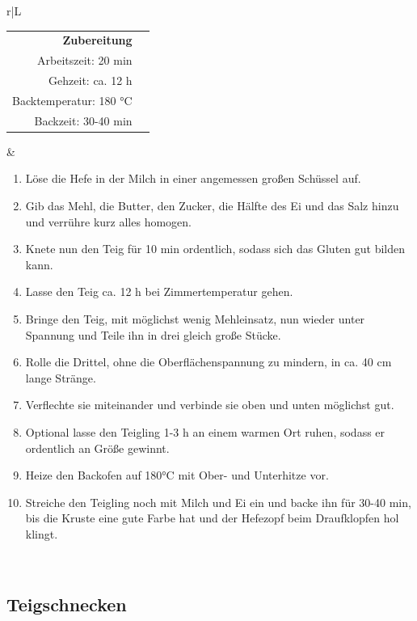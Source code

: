 \documentclass[a4paper, 12pt]{scrbook} 								%
\numberwithin{equation}{section} 									%
\begin{document}
		\begin{tabularx}{\textwidth}{r|L}
			\begin{tabular}[t]{rr}
				\textbf{Zubereitung}	\\
				Arbeitszeit: 20 min	\\
				Gehzeit: ca. 12 h \\
				Backtemperatur: 180 °C \\
				Backzeit: 30-40 min \\
			\end{tabular}			&	\begin{enumerate}[]
											\item Löse die Hefe in der Milch in einer angemessen großen Schüssel auf.
											\item Gib das Mehl, die Butter, den Zucker, die Hälfte des Ei und das Salz hinzu und verrühre kurz alles homogen.
											\item Knete nun den Teig für 10 min ordentlich, sodass sich das Gluten gut bilden kann.
											\item Lasse den Teig ca. 12 h bei Zimmertemperatur gehen.
											\item Bringe den Teig, mit möglichst wenig Mehleinsatz, nun wieder unter Spannung und Teile ihn in drei gleich große Stücke.
											\item Rolle die Drittel, ohne die Oberflächenspannung zu mindern, in ca. 40 cm lange Stränge.
											\item Verflechte sie miteinander und verbinde sie oben und unten möglichst gut.
											\item Optional lasse den Teigling 1-3 h an einem warmen Ort ruhen, sodass er ordentlich an Größe gewinnt.
											\item Heize den Backofen auf 180°C mit Ober- und Unterhitze vor.
											\item Streiche den Teigling noch mit Milch und Ei ein und backe ihn für 30-40 min, bis die Kruste eine gute Farbe hat und der Hefezopf beim Draufklopfen hol klingt.
										\end{enumerate}	\\
		\end{tabularx}
		\newpage


		\subsection{Teigschnecken}	\label{teigschnecken}
\end{document}

